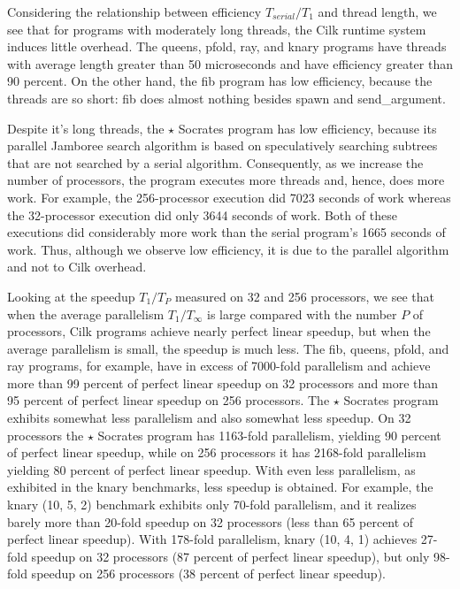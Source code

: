 \documentclass[
]{article}
\begin{document}
Considering the relationship between efficiency \(T_{serial}/T_{1}\) and
thread length, we see that for programs with moderately long threads,
the Cilk runtime system induces little overhead. The queens, pfold, ray,
and knary programs have threads with average length greater than 50
microseconds and have efficiency greater than 90 percent. On the other
hand, the fib program has low efficiency, because the threads are so
short: fib does almost nothing besides spawn and send\_argument.

Despite it's long threads, the \(\star\) Socrates program has low
efficiency, because its parallel Jamboree search algorithm is based on
speculatively searching subtrees that are not searched by a serial
algorithm. Consequently, as we increase the number of processors, the
program executes more threads and, hence, does more work. For example,
the 256-processor execution did 7023 seconds of work whereas the
32-processor execution did only 3644 seconds of work. Both of these
executions did considerably more work than the serial program's 1665
seconds of work. Thus, although we observe low efficiency, it is due to
the parallel algorithm and not to Cilk overhead.

Looking at the speedup \(T_1 / T_P\) measured on 32 and 256 processors,
we see that when the average parallelism \(T_1 / T_\infty\) is large
compared with the number \(P\) of processors, Cilk programs achieve
nearly perfect linear speedup, but when the average parallelism is
small, the speedup is much less. The fib, queens, pfold, and ray
programs, for example, have in excess of 7000-fold parallelism and
achieve more than 99 percent of perfect linear speedup on 32 processors
and more than 95 percent of perfect linear speedup on 256 processors.
The \(\star\) Socrates program exhibits somewhat less parallelism and
also somewhat less speedup. On 32 processors the \(\star\) Socrates
program has 1163-fold parallelism, yielding 90 percent of perfect linear
speedup, while on 256 processors it has 2168-fold parallelism yielding
80 percent of perfect linear speedup. With even less parallelism, as
exhibited in the knary benchmarks, less speedup is obtained. For
example, the knary (10, 5, 2) benchmark exhibits only 70-fold
parallelism, and it realizes barely more than 20-fold speedup on 32
processors (less than 65 percent of perfect linear speedup). With
178-fold parallelism, knary (10, 4, 1) achieves 27-fold speedup on 32
processors (87 percent of perfect linear speedup), but only 98-fold
speedup on 256 processors (38 percent of perfect linear speedup).
\end{document}
